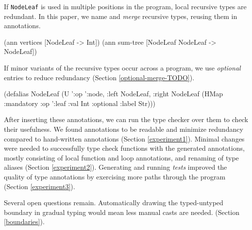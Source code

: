 %
If \texttt{NodeLeaf} is used in multiple positions
in the program, local recursive types are redundant.
In this paper, we name and \textit{merge} recursive
types, reusing them in annotations.
 
\begin{cljlisting}
(ann vertices [NodeLeaf -> Int])
(ann sum-tree [NodeLeaf NodeLeaf -> NodeLeaf])
\end{cljlisting}
 
If minor variants of the recursive types occur
across a program,
we use \textit{optional} entries%
to reduce redundancy (Section \ref{optional-merge-TODO}).
 
\begin{cljlisting}
(defalias NodeLeaf 
  (U '{:op ':node, :left NodeLeaf, :right NodeLeaf}
     (HMap :mandatory {:op ':leaf :val Int}
           :optional {:label Str})))
\end{cljlisting}

After inserting these annotations, we can run the
type checker over them to check their usefulness.
We found annotations to be readable and minimize
redundancy compared to hand-written annotations
(Section \ref{experiment1}).
Minimal changes were needed to successfully type check
functions with the generated annotations,
mostly consisting of local function and loop annotations,
and renaming of type aliases
(Section \ref{experiment2}).
Generating and running \textit{tests} improved the quality
of type annotations by exercising more paths through the
program (Section \ref{experiment3}).

Several open questions remain.
Automatically
drawing the typed-untyped boundary in gradual typing
would mean less manual casts are needed.
(Section \ref{boundaries}).

